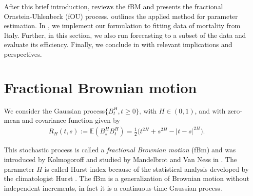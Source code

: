 \documentclass[smallextended]{svjour3}
\newcommand{\E}{\mathbb{E}}
\begin{document}


        After this brief introduction,  reviews the fBM and presents
    the fractional Ornstein-Uhlenbeck (fOU) process.  outlines the
    applied method for parameter estimation. In  , we implement our
    formulation to fitting data of mortality from Italy. Further, in
    this section, we also run forecasting to a subset of the data and evaluate
    its efficiency. Finally, we conclude in  with relevant
    implications and perspectives.


\section{Fractional Brownian motion} \label{fgn}

        We consider the Gaussian process$\{B_t^H,t\ge 0\}$, with $H\in (0,1)$,
    and with zero-mean and covariance function given by
    \begin{align}
        R_H(t,s):=
            \E(
                B_s^H B_t^H
            )
            =
            \tfrac{1}{2}
            \big(
                t ^ {2 H} + s ^ {2 H}
                - |t - s| ^ {2 H}
            \big).\label{s1.1}
    \end{align}

        This stochastic process is called a \emph{fractional Brownian motion}
    (fBm) and was introduced by Kolmogoroff \cite{ko} and studied by Mandelbrot
    and Van Ness in \cite{ma-va}. The parameter $H$ is called Hurst index
    because of the statistical analysis developed by the climatologist Hurst
    \cite{hu}. The fBm is a generalization of Brownian motion without
    independent increments, in fact it is a continuous-time Gaussian process.
\end{document}
